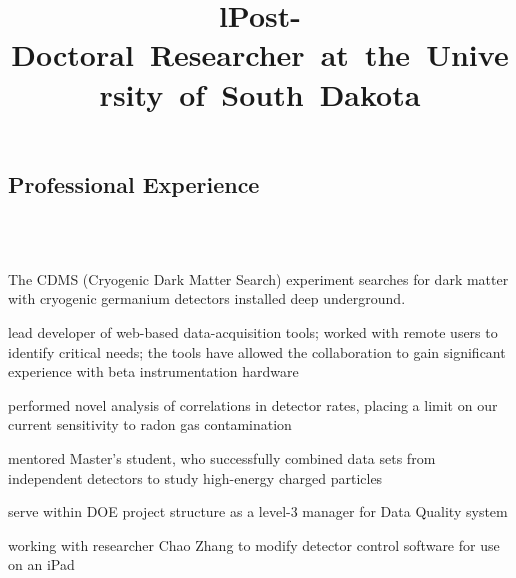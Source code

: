 \documentclass[overlapped,line,letterpaper]{res}
\begin{document}
\begin{resume}
\section{\bf Professional Experience}

\begin{format}
\title{l}\\
\vspace{0.7mm}
\body\\
\end{format}

\title{\mbox{Post-Doctoral Researcher at the University of South Dakota}}
\begin{position}
  The CDMS (Cryogenic Dark Matter Search) experiment searches for dark matter with cryogenic germanium detectors installed deep underground.
\begin{itemize}
\renewcommand{\labelitemi}{-}
{\setlength\itemindent{15pt} \item lead developer of web-based data-acquisition tools; worked with remote users to identify critical needs; the tools have allowed the collaboration to gain significant experience with beta instrumentation hardware}
{\setlength\itemindent{15pt} \item performed novel analysis of correlations in detector rates, placing a limit on our current sensitivity to radon gas contamination}
{\setlength\itemindent{15pt} \item mentored Master's student, who successfully combined data sets from independent detectors to study high-energy charged particles}
{\setlength\itemindent{15pt} \item serve within DOE project structure as a level-3 manager for Data Quality system }
{\setlength\itemindent{15pt} \item working with researcher Chao Zhang to modify detector control software for use on an iPad}
\end{itemize}
\end{position}


\end{resume}
\end{document}
